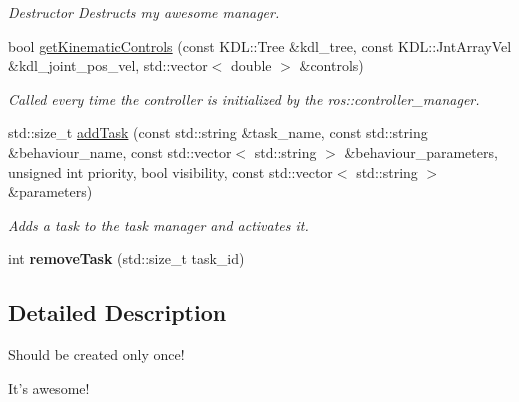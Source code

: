 \begin{DoxyCompactItemize}
\begin{DoxyCompactList}\small\item\em Destructor Destructs my awesome manager. \end{DoxyCompactList}\item 
bool \hyperlink{classhiqp_1_1TaskManager_a54458771323acf4e35b1543473810d20}{get\-Kinematic\-Controls} (const K\-D\-L\-::\-Tree \&kdl\-\_\-tree, const K\-D\-L\-::\-Jnt\-Array\-Vel \&kdl\-\_\-joint\-\_\-pos\-\_\-vel, std\-::vector$<$ double $>$ \&controls)
\begin{DoxyCompactList}\small\item\em Called every time the controller is initialized by the ros\-::controller\-\_\-manager. \end{DoxyCompactList}\item 
std\-::size\-\_\-t \hyperlink{classhiqp_1_1TaskManager_a623cbd089f186f92293721d08f6fc5b4}{add\-Task} (const std\-::string \&task\-\_\-name, const std\-::string \&behaviour\-\_\-name, const std\-::vector$<$ std\-::string $>$ \&behaviour\-\_\-parameters, unsigned int priority, bool visibility, const std\-::vector$<$ std\-::string $>$ \&parameters)
\begin{DoxyCompactList}\small\item\em Adds a task to the task manager and activates it. \end{DoxyCompactList}\item 
\hypertarget{classhiqp_1_1TaskManager_a2e7eae21859a4ef31d502a227e6d15b5}{int {\bfseries remove\-Task} (std\-::size\-\_\-t task\-\_\-id)}\label{classhiqp_1_1TaskManager_a2e7eae21859a4ef31d502a227e6d15b5}

\end{DoxyCompactItemize}


\subsection{Detailed Description}
Should be created only once! 

It's awesome! 

